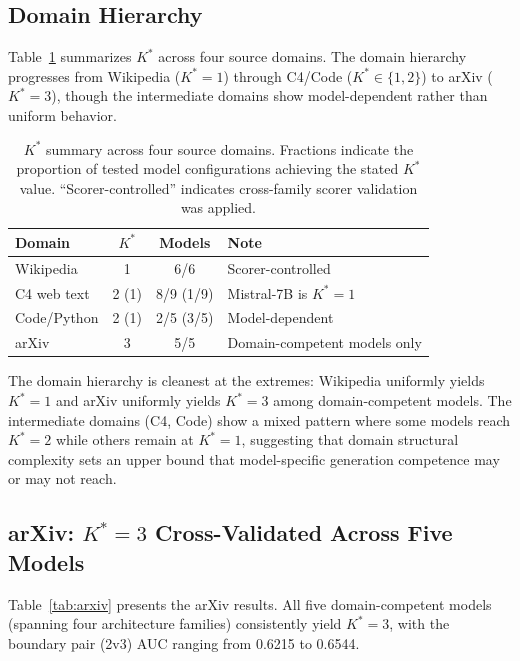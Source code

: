 \documentclass[11pt]{article}
\newcommand{\kstar}{K^*}
\begin{document}
\subsection{Domain Hierarchy}
\label{sec:domains}

Table~\ref{tab:domain_summary} summarizes $\kstar$ across four source domains. The domain hierarchy progresses from Wikipedia ($\kstar{=}1$) through C4/Code ($\kstar \in \{1,2\}$) to arXiv ($\kstar{=}3$), though the intermediate domains show model-dependent rather than uniform behavior.

\begin{table}[t]
\centering
\caption{$\kstar$ summary across four source domains. Fractions indicate the proportion of tested model configurations achieving the stated $\kstar$ value. ``Scorer-controlled'' indicates cross-family scorer validation was applied.}
\label{tab:domain_summary}
\small
\begin{tabular}{lccl}
\toprule
Domain & $\kstar$ & Models & Note \\
\midrule
Wikipedia & 1 & 6/6 & Scorer-controlled \\
C4 web text & 2 (1) & 8/9 (1/9) & Mistral-7B is $\kstar{=}1$ \\
Code/Python & 2 (1) & 2/5 (3/5) & Model-dependent \\
arXiv & 3 & 5/5 & Domain-competent models only \\
\bottomrule
\end{tabular}
\end{table}

The domain hierarchy is cleanest at the extremes: Wikipedia uniformly yields $\kstar{=}1$ and arXiv uniformly yields $\kstar{=}3$ among domain-competent models. The intermediate domains (C4, Code) show a mixed pattern where some models reach $\kstar{=}2$ while others remain at $\kstar{=}1$, suggesting that domain structural complexity sets an upper bound that model-specific generation competence may or may not reach.


\subsection{arXiv: $\kstar{=}3$ Cross-Validated Across Five Models}
\label{sec:arxiv}

Table~\ref{tab:arxiv} presents the arXiv results. All five domain-competent models (spanning four architecture families) consistently yield $\kstar{=}3$, with the boundary pair (2v3) AUC ranging from 0.6215 to 0.6544.
\end{document}
